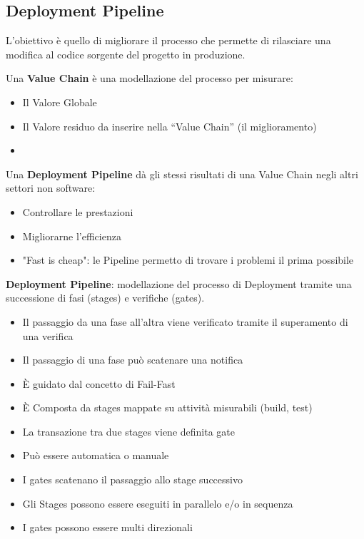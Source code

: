 \subsection{Deployment Pipeline} 
L’obiettivo è quello di migliorare il processo che permette di rilasciare una modifica al codice sorgente del progetto in produzione.
\begin{multicols}{2}
    \raggedright
    Una \textbf{Value Chain} è una modellazione del processo per misurare:
    \begin{itemize}
        \item Il Valore Globale
        \item Il Valore residuo da inserire nella “Value Chain” (il miglioramento)
        \item[]
    \end{itemize}
    \columnbreak
    Una \textbf{Deployment Pipeline} dà gli stessi risultati di una Value Chain negli altri settori non software:
    \begin{itemize}
        \item Controllare le prestazioni
        \item Migliorarne l'efficienza
        \item "Fast is cheap": le Pipeline permetto di trovare i problemi il prima possibile
    \end{itemize}
\end{multicols}
\begin{mdframed}
    \textbf{Deployment Pipeline}: modellazione del processo di Deployment tramite una successione di fasi (stages) e verifiche (gates).
\end{mdframed}
\begin{itemize}
    \item Il passaggio da una fase all’altra viene verificato tramite il superamento di una verifica
    \item Il passaggio di una fase può scatenare una notifica
    \item È guidato dal concetto di Fail-Fast
    \item È Composta da stages mappate su attività misurabili (build, test)
    \item La transazione tra due stages viene definita gate
    \item Può essere automatica o manuale
    \item I gates scatenano il passaggio allo stage successivo
    \item Gli Stages possono essere eseguiti in parallelo e/o in sequenza
    \item I gates possono essere multi direzionali
\end{itemize}

